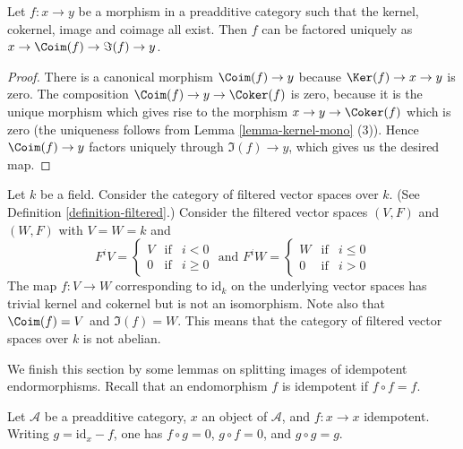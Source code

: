 \begin{lemma}
\label{lemma-coim-im-map}
Let $f : x \to y$ be a morphism in a preadditive category
such that the kernel, cokernel, image and coimage all exist.
Then $f$ can be factored uniquely as
$x \to \Coim(f) \to \Im(f) \to y$.
\end{lemma}

\begin{proof}
There is a canonical morphism $\Coim(f) \to y$
because $\Ker(f) \to x \to y$ is zero.
The composition $\Coim(f) \to y \to \Coker(f)$
is zero, because it is the unique morphism which gives
rise to the morphism $x \to y \to \Coker(f)$ which
is zero
(the uniqueness follows from
Lemma \ref{lemma-kernel-mono} (3)).
Hence $\Coim(f) \to y$ factors uniquely through
$\Im(f) \to y$, which gives us the desired map.
\end{proof}

\begin{example}
\label{example-not-abelian}
Let $k$ be a field.
Consider the category
of filtered vector spaces over $k$.
(See Definition \ref{definition-filtered}.)
Consider the filtered vector spaces $(V, F)$ and $(W, F)$ with
$V = W = k$ and
$$
F^iV
=
\left\{
\begin{matrix}
V & \text{if} & i < 0 \\
0 & \text{if} & i \geq 0
\end{matrix}
\right.
\text{ and }
F^iW
=
\left\{
\begin{matrix}
W & \text{if} & i \leq 0 \\
0 & \text{if} & i > 0
\end{matrix}
\right.
$$
The map $f : V \to W$ corresponding to $\text{id}_k$ on the underlying
vector spaces has trivial kernel and cokernel but is not
an isomorphism. Note also that $\Coim(f) = V$ and $\Im(f) = W$.
This means that the category of filtered vector spaces over $k$
is not abelian.
\end{example}

\noindent
We finish this section by some lemmas on splitting images of
idempotent endormorphisms. Recall that an endomorphism $f$
is idempotent if $f \circ f = f$.

\begin{remark}
\label{remark-idempotent-symmetry}
Let $\mathcal{A}$ be a preadditive category,
$x$ an object of $\mathcal{A}$,
and $f : x \to x$ idempotent.
Writing $g = \text{id} _ x - f$,
one has $f \circ g = 0$, $g \circ f = 0$, and $g \circ g = g$.
\end{remark}

